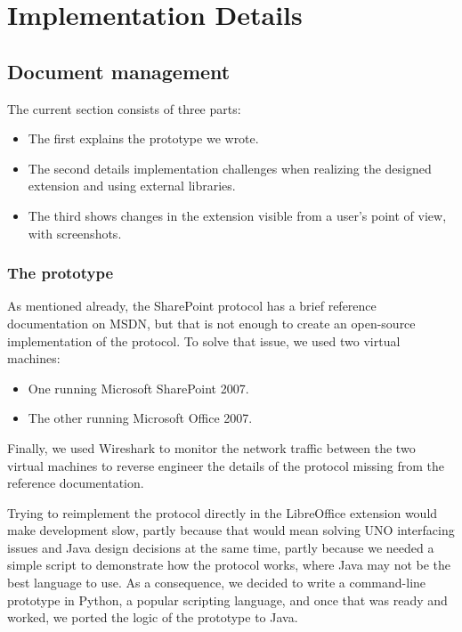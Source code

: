 \chapter{Implementation Details}

\section{Document management}

The current section consists of three parts:

\begin{itemize}
\item The first explains the prototype we wrote.
\item The second details implementation challenges when realizing the designed extension and using external libraries.
\item The third shows changes in the extension visible from a user's point of view, with screenshots.
\end{itemize}

\subsection{The prototype}

As mentioned already, the SharePoint protocol has a brief reference
documentation on MSDN, but that is not enough to create an open-source
implementation of the protocol. To solve that issue, we used two virtual
machines:

\begin{itemize}
\item One running Microsoft SharePoint 2007.
\item The other running Microsoft Office 2007.
\end{itemize}

Finally, we used Wireshark \cite{wireshark} to monitor the network traffic
between the two virtual machines to reverse engineer the details of the
protocol missing from the reference documentation.

Trying to reimplement the protocol directly in the LibreOffice extension would
make development slow, partly because that would mean solving UNO interfacing
issues and Java design decisions at the same time, partly because we needed a
simple script to demonstrate how the protocol works, where Java may not be the
best language to use. As a consequence, we decided to write a command-line
prototype in Python, a popular scripting language, and once that was ready and
worked, we ported the logic of the prototype to Java.

